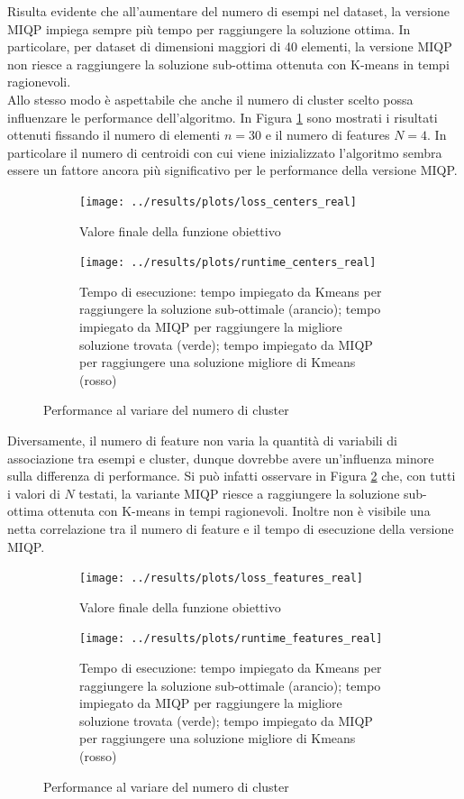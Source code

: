 \documentclass{article}
\begin{document}
    Risulta evidente che all'aumentare del numero di esempi nel dataset, la versione MIQP impiega sempre più tempo per raggiungere la soluzione ottima. In particolare, per dataset di dimensioni maggiori di 40 elementi, la versione MIQP non riesce a raggiungere la soluzione sub-ottima ottenuta con K-means in tempi ragionevoli.\\
    Allo stesso modo è aspettabile che anche il numero di cluster scelto possa influenzare le performance dell'algoritmo. In Figura \ref{fig:8} sono mostrati i risultati ottenuti fissando il numero di elementi $n=30$ e il numero di features $N=4$. In particolare il numero di centroidi con cui viene inizializzato l'algoritmo sembra essere un fattore ancora più significativo per le performance della versione MIQP.
    \begin{figure}[H]
     \centering
     \begin{subfigure}[t]{0.49\linewidth}
         \centering
         \texttt{[image: ../results/plots/loss\_centers\_real]}
         \caption{Valore finale della funzione obiettivo}
     \end{subfigure}
     \hfill
     \begin{subfigure}[t]{0.49\linewidth}
         \centering
         \texttt{[image: ../results/plots/runtime\_centers\_real]}
         \caption{Tempo di esecuzione: tempo impiegato da Kmeans per raggiungere la soluzione sub-ottimale (arancio); tempo impiegato da MIQP per raggiungere la migliore soluzione trovata (verde); tempo impiegato da MIQP per raggiungere una soluzione migliore di Kmeans (rosso)}
     \end{subfigure}
        \label{fig:8}
        \caption{Performance al variare del numero di cluster}
     \end{figure}
    Diversamente, il numero di feature non varia la quantità di variabili di associazione tra esempi e cluster, dunque dovrebbe avere un'influenza minore sulla differenza di performance. Si può infatti osservare in Figura \ref{fig:9} che, con tutti i valori di $N$ testati, la variante MIQP riesce a raggiungere la soluzione sub-ottima ottenuta con K-means in tempi ragionevoli. Inoltre non è visibile una netta correlazione tra il numero di feature e il tempo di esecuzione della versione MIQP.
    \begin{figure}[H]
     \centering
     \begin{subfigure}[t]{0.49\linewidth}
         \centering
         \texttt{[image: ../results/plots/loss\_features\_real]}
         \caption{Valore finale della funzione obiettivo}
     \end{subfigure}
     \hfill
     \begin{subfigure}[t]{0.49\linewidth}
         \centering
         \texttt{[image: ../results/plots/runtime\_features\_real]}
         \caption{Tempo di esecuzione: tempo impiegato da Kmeans per raggiungere la soluzione sub-ottimale (arancio); tempo impiegato da MIQP per raggiungere la migliore soluzione trovata (verde); tempo impiegato da MIQP per raggiungere una soluzione migliore di Kmeans (rosso)}
     \end{subfigure}
        \label{fig:9}
        \caption{Performance al variare del numero di cluster}
     \end{figure}
\end{document}
